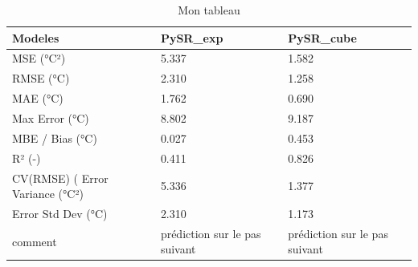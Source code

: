 \begin{table}
\caption{Mon tableau}
\label{tab:mon_tableau}
\begin{tabular}{lll}
\toprule
Modeles & PySR_exp & PySR_cube \\
\midrule
MSE (°C²) & 5.337 & 1.582 \\
RMSE (°C) & 2.310 & 1.258 \\
MAE (°C) & 1.762 & 0.690 \\
Max Error (°C) & 8.802 & 9.187 \\
MBE / Bias (°C) & 0.027 & 0.453 \\
R² (-) & 0.411 & 0.826 \\
CV(RMSE) (%
Error Variance (°C²) & 5.336 & 1.377 \\
Error Std Dev (°C) & 2.310 & 1.173 \\
comment & prédiction sur le pas suivant & prédiction sur le pas suivant \\
\bottomrule
\end{tabular}
\end{table}

